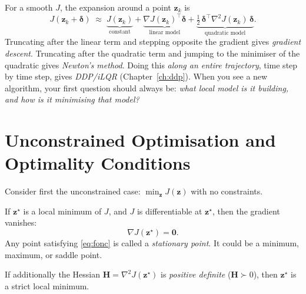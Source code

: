 \documentclass[11pt,twoside]{report}
\theoremstyle{definition}
\theoremstyle{plain}
\theoremstyle{remark}
\newcommand{\0}{\bm{0}}
\begin{document}
\begin{insightbox}
For a smooth $J$, the expansion around a point $\bm{z}_{k}$ is
\begin{equation*}
J(\bm{z}_{k}+\bm{\delta})
\;\approx\;
\underbrace{J(\bm{z}_{k})}_{\text{constant}}
+\underbrace{\nabla J(\bm{z}_{k})^{\!\top}\bm{\delta}}_{\text{linear model}}
+\underbrace{\tfrac12\,\bm{\delta}^{\!\top}\nabla^{2}J(\bm{z}_{k})\,\bm{\delta}}_{\text{quadratic model}}.
\end{equation*}
Truncating after the linear term and stepping opposite the gradient
gives \emph{gradient descent}.
Truncating after the quadratic term and jumping to the minimiser of the
quadratic gives \emph{Newton's method}.
Doing this \emph{along an entire trajectory}, time step by time step,
gives \emph{DDP/iLQR} (Chapter~\ref{ch:ddp}).
When you see a new algorithm, your first question should always be:
\emph{what local model is it building, and how is it minimising that model?}
\end{insightbox}

\section{Unconstrained Optimisation and Optimality Conditions}
\label{sec:unconstrained}

Consider first the unconstrained case: $\min_{\bm{z}} J(\bm{z})$ with no
constraints.

\begin{definitionbox}
If $\bm{z}^{\star}$ is a local minimum of $J$, and $J$ is differentiable at $\bm{z}^{\star}$, then the gradient vanishes:
\begin{equation}\label{eq:fonc}
\nabla J(\bm{z}^{\star}) = \0.
\end{equation}
Any point satisfying \eqref{eq:fonc} is called a \emph{stationary point}.
It could be a minimum, maximum, or saddle point.
\end{definitionbox}

\begin{definitionbox}
If additionally the Hessian $\bm{H}=\nabla^{2}J(\bm{z}^{\star})$ is
\emph{positive definite} ($\bm{H}\succ 0$), then $\bm{z}^{\star}$ is a
strict local minimum.
\end{definitionbox}
\end{document}
